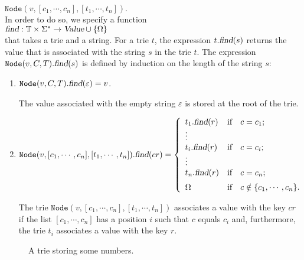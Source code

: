 \\[0.2cm]
\hspace*{1.3cm} 
$\texttt{Node}(v, [c_1, \cdots, c_n], [t_1, \cdots, t_n])$.
\\[0.2cm]
In order to do so, we specify a function
\\[0.2cm]
\hspace*{1.3cm} 
$\textsl{find}: \mathbb{T} \times \Sigma^* \rightarrow \textsl{Value} \cup \{ \Omega\}$
\\[0.2cm]
that takes a trie and a string.  For a trie $t$, the expression $t.\textsl{find}(s)$ returns the
value that is associated with the string $s$ in the trie $t$.  The expression
$\texttt{Node}(v,C,T).\textsl{find}(s)$ is defined by induction on the length of the  string $s$:
\begin{enumerate}
\item $\texttt{Node}(v, C, T).\textsl{find}(\varepsilon) = v$.

      The value associated with the empty string $\varepsilon$ is stored at the root of the trie.
\item $\texttt{Node}(v, [c_1, \cdots, c_n], [t_1, \cdots, t_n]).\textsl{find}(cr) = 
        \left\{
        \begin{array}{ll}
        t_1.\textsl{find}(r) & \mbox{if} \quad c = c_1 \mbox{;} \\
        \vdots &                                     \\
        t_i.\textsl{find}(r) & \mbox{if} \quad c = c_i \mbox{;} \\
        \vdots &                                     \\
        t_n.\textsl{find}(r) & \mbox{if} \quad c = c_n \mbox{;} \\[0.2cm]
        \Omega               & \mbox{if} \quad c \notin \{c_1,\cdots,c_n\} \mbox{.}         
        \end{array}
       \right.$

      The trie $\texttt{Node}(v, [c_1, \cdots, c_n], [t_1, \cdots, t_n])$ associates a value with
      the key $cr$ if the list $[c_1, \cdots, c_n]$ has a position $i$ such that $c$ equals $c_i$
      and, furthermore, the trie  $t_i$ associates a value with the key  $r$.
\end{enumerate}

\begin{figure}[!ht]
  \centering
  \caption{A trie storing some numbers.}
  \label{fig:trie}
\end{figure}

